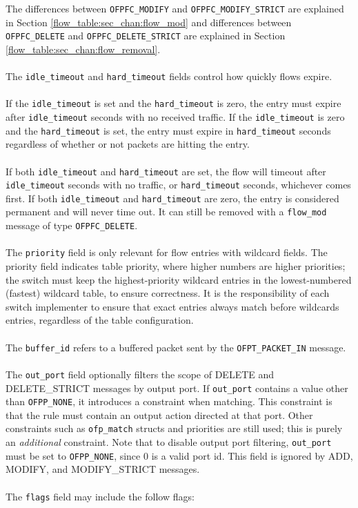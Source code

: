 
The differences between \verb|OFPFC_MODIFY| and \verb|OFPFC_MODIFY_STRICT| are explained in Section \ref{flow_table:sec_chan:flow_mod} and differences between \verb|OFPFC_DELETE| and \verb|OFPFC_DELETE_STRICT| are explained in Section \ref{flow_table:sec_chan:flow_removal}. 
\\\\
The \verb|idle_timeout| and \verb|hard_timeout| fields control how quickly flows expire.  
\\\\
If the \verb|idle_timeout| is set and the \verb|hard_timeout| is zero, the entry must expire after \verb|idle_timeout| seconds with no received traffic.  If the \verb|idle_timeout| is zero and the \verb|hard_timeout| is set, the entry must expire in \verb|hard_timeout| seconds regardless of whether or not packets are hitting the entry.
\\\\
If both \verb|idle_timeout| and \verb|hard_timeout| are set, the flow will timeout after \verb|idle_timeout| seconds with no traffic, or \verb|hard_timeout| seconds, whichever comes first.  If both \verb|idle_timeout| and \verb|hard_timeout| are zero, the entry is considered permanent and will never time out.  It can still be removed with a \verb|flow_mod| message of type \verb|OFPFC_DELETE|. 
\\\\
The \verb|priority| field is only relevant for flow entries with wildcard fields.  The priority field indicates table priority, where higher numbers are higher priorities; the switch must keep the highest-priority wildcard entries in the lowest-numbered (fastest) wildcard table, to ensure correctness.  It is the responsibility of each switch implementer to ensure that exact entries always match before wildcards entries, regardless of the table configuration.  
\\\\
The \verb|buffer_id| refers to a buffered packet sent by the \verb|OFPT_PACKET_IN| message.
\\\\
The \verb|out_port| field optionally filters the scope of DELETE and DELETE\_STRICT messages by output port.  If \verb|out_port| contains a value other than \verb|OFPP_NONE|, it introduces a constraint when matching.  This constraint is that the rule must contain an output action directed at that port.  Other constraints such as \verb|ofp_match| structs and priorities are still used; this is purely an \emph{additional} constraint.  Note that to disable output port filtering, \verb|out_port| must be set to \verb|OFPP_NONE|, since 0 is a valid port id.  This field is ignored by ADD, MODIFY, and MODIFY\_STRICT messages.
\\\\
The \verb|flags| field may include the follow flags:


